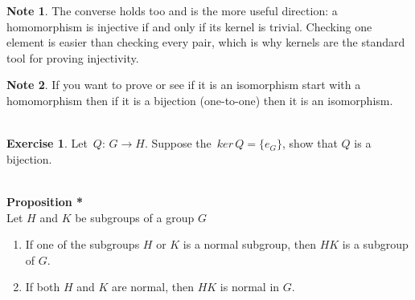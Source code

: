 \documentclass[11pt,a4paper]{article}
\theoremstyle{definition}
\newtheorem{exe}[thm]{Exercise}
\newtheorem*{note}{Note}
\begin{document}
\begin{note}
The converse holds too and is the more useful direction: a homomorphism is
injective if and only if its kernel is trivial. Checking one element is easier
than checking every pair, which is why kernels are the standard tool for
proving injectivity.
\end{note}













\begin{note}
If you want to prove or see if it is an isomorphism start with a homomorphism then if it is a bijection (one-to-one) then it is an isomorphism.\\\\
\end{note}




\begin{exe}
Let $\, Q:\, G\longrightarrow H$. Suppose the $\, ker\, Q = \{e_G\}$, show that $Q$ is a bijection.\\\\
\end{exe}






\textbf{Proposition *}\\
Let $H$ and $K$ be subgroups of a group $G$
\begin{enumerate}
\item[(i)] If one of the subgroups $H$ or $K$ is a normal subgroup, then $HK$ is a subgroup of $G$.
\item[(ii)] If both $H$ and $K$ are normal, then $HK$ is normal in $G$.\\\\
\end{enumerate}
\end{document}
